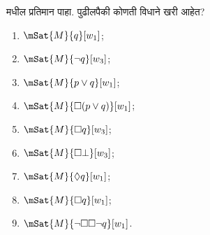 \documentclass[../../../include/open-logic-section]{subfiles}
\begin{document}
\begin{prob}
   मधील प्रतिमान पाहा. पुढीलपैकी
  कोणती विधाने खरी आहेत?
    \begin{enumerate}
    \item $\mSat{M}{q}[w_1]$;
    \item $\mSat{M}{\lnot q}[w_3]$;
    \item $\mSat{M}{p \lor q}[w_1]$;
    \item $\mSat{M}{\Box (p \lor q)}[w_1]$;
    \item $\mSat{M}{\Box q}[w_3]$;
    \item $\mSat{M}{\Box \bot}[w_3]$;
    \item $\mSat{M}{\Diamond q}[w_1]$;
    \item $\mSat{M}{\Box q}[w_1]$;
    \item $\mSat{M}{\lnot \Box\Box \lnot q}[w_1]$.
    \end{enumerate}
\end{prob}
\end{document}
